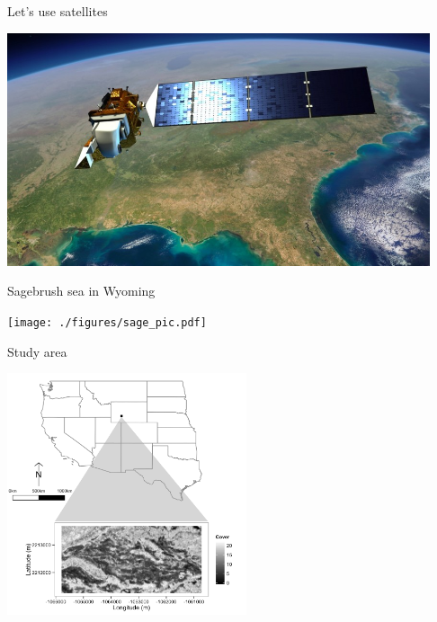 \documentclass[12pt, compress, aspectratio=1610]{beamer}
\let\OldTexttt\texttt
\renewcommand{\texttt}[1]{\OldTexttt{\color{codecolor}#1}}
\begin{document}
\begin{frame}{%
\protect\hypertarget{lets-use-satellites}{%
Let’s use satellites}}

\centering

\includegraphics[height=2.7in]{./figures/landsat8.jpg}

\end{frame}

\begin{frame}{%
\protect\hypertarget{sagebrush-sea-in-wyoming}{%
Sagebrush sea in Wyoming}}

\centering

\texttt{[image: ./figures/sage\_pic.pdf]}

\end{frame}

\begin{frame}{%
\protect\hypertarget{study-area}{%
Study area}}

\centering

\includegraphics[height=2.8in]{./figures/studyarea_map.png}

\end{frame}
\end{document}
